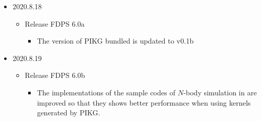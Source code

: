 \begin{itemize}[leftmargin=*,itemsep=-1ex]
\item 2020.8.18
\begin{itemize}
\item Release FDPS 6.0a
\begin{itemize}
\item The version of PIKG bundled is updated to v0.1b
\end{itemize}
\end{itemize}

  \item 2020.8.19
    \begin{itemize}
    \item Release FDPS 6.0b
       \begin{itemize}
          \item The implementations of the sample codes of $N$-body simulation in  are improved so that they shows better performance when using kernels generated by PIKG.
       \end{itemize}
    \end{itemize}
\end{itemize} 